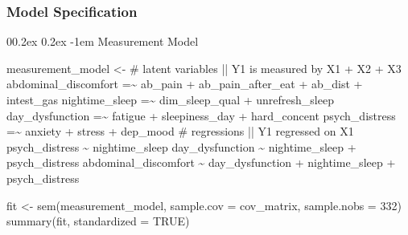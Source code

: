 \documentclass[
  man]{apa6}
\makeatletter
\newenvironment{Shaded}{\begin{snugshade}}{\end{snugshade}}
\newcommand{\AttributeTok}[1]{\textcolor[rgb]{0.77,0.63,0.00}{#1}}
\newcommand{\ConstantTok}[1]{\textcolor[rgb]{0.00,0.00,0.00}{#1}}
\newcommand{\DecValTok}[1]{\textcolor[rgb]{0.00,0.00,0.81}{#1}}
\newcommand{\FunctionTok}[1]{\textcolor[rgb]{0.00,0.00,0.00}{#1}}
\newcommand{\NormalTok}[1]{#1}
\newcommand{\OtherTok}[1]{\textcolor[rgb]{0.56,0.35,0.01}{#1}}
\newcommand{\StringTok}[1]{\textcolor[rgb]{0.31,0.60,0.02}{#1}}
\let\oldparagraph\paragraph
\renewcommand{\paragraph}[1]{\oldparagraph{#1}\mbox{}}
\renewcommand{\paragraph}{\@startsection{paragraph}{4}{\parindent}%
  {0\baselineskip \@plus 0.2ex \@minus 0.2ex}%
  {-1em}%
  {\normalfont\normalsize\bfseries\itshape\typesectitle}}
\makeatother
\begin{document}
\hypertarget{model-specification}{%
\subsubsection{Model Specification}\label{model-specification}}

\hypertarget{measurement-model}{%
\paragraph{Measurement Model}\label{measurement-model}}

\begin{Shaded}
\begin{Highlighting}[]
\NormalTok{measurement\_model }\OtherTok{\textless{}{-}} \StringTok{\textquotesingle{}}
\StringTok{  \# latent variables ||  Y1 is measured by X1 + X2 + X3}
\StringTok{    abdominal\_discomfort =\textasciitilde{} ab\_pain + ab\_pain\_after\_eat + ab\_dist + intest\_gas}
\StringTok{    }
\StringTok{    nightime\_sleep =\textasciitilde{} dim\_sleep\_qual + unrefresh\_sleep}
\StringTok{    }
\StringTok{    day\_dysfunction =\textasciitilde{} fatigue + sleepiness\_day + hard\_concent}
\StringTok{    }
\StringTok{    psych\_distress =\textasciitilde{} anxiety + stress + dep\_mood}
\StringTok{    }
\StringTok{  \# regressions || Y1 regressed on X1 }
\StringTok{  }
\StringTok{    psych\_distress \textasciitilde{} nightime\_sleep}
\StringTok{    day\_dysfunction \textasciitilde{} nightime\_sleep + psych\_distress}
\StringTok{    abdominal\_discomfort \textasciitilde{} day\_dysfunction + nightime\_sleep + psych\_distress}
\StringTok{  }
\StringTok{\textquotesingle{}}

\NormalTok{fit }\OtherTok{\textless{}{-}} \FunctionTok{sem}\NormalTok{(measurement\_model, }
           \AttributeTok{sample.cov =}\NormalTok{ cov\_matrix, }
           \AttributeTok{sample.nobs =} \DecValTok{332}\NormalTok{)}
\FunctionTok{summary}\NormalTok{(fit, }\AttributeTok{standardized =} \ConstantTok{TRUE}\NormalTok{)}
\end{Highlighting}
\end{Shaded}
\end{document}
